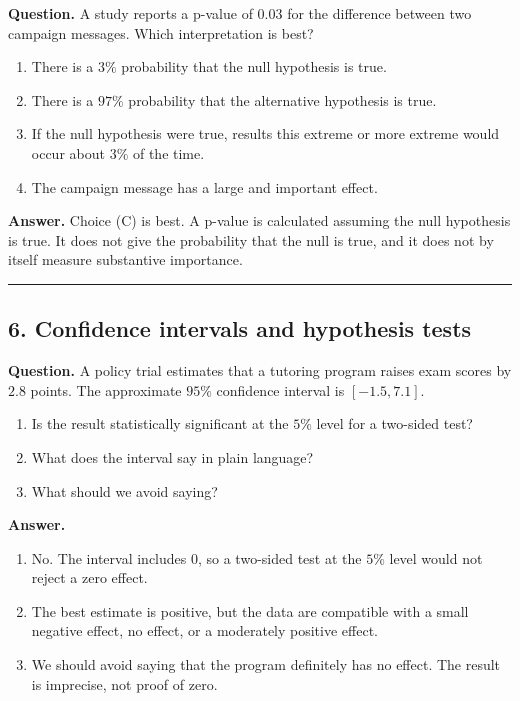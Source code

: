 \documentclass[12pt]{article}
\begin{document}
\noindent
\textbf{Question.}
A study reports a p-value of $0.03$ for the difference between two campaign messages. Which interpretation is best?

\begin{enumerate}[label=(\Alph*)]
\item There is a $3\%$ probability that the null hypothesis is true.
\item There is a $97\%$ probability that the alternative hypothesis is true.
\item If the null hypothesis were true, results this extreme or more extreme would occur about $3\%$ of the time.
\item The campaign message has a large and important effect.
\end{enumerate}

\noindent
\textbf{Answer.}
Choice (C) is best. A p-value is calculated assuming the null hypothesis is true. It does not give the probability that the null is true, and it does not by itself measure substantive importance.

\hrule

\subsection*{6. Confidence intervals and hypothesis tests}

\noindent
\textbf{Question.}
A policy trial estimates that a tutoring program raises exam scores by $2.8$ points. The approximate $95\%$ confidence interval is $[-1.5,7.1]$.

\begin{enumerate}[label=(\alph*)]
\item Is the result statistically significant at the $5\%$ level for a two-sided test?
\item What does the interval say in plain language?
\item What should we avoid saying?
\end{enumerate}

\noindent
\textbf{Answer.}
\begin{enumerate}[label=(\alph*)]
\item No. The interval includes $0$, so a two-sided test at the $5\%$ level would not reject a zero effect.
\item The best estimate is positive, but the data are compatible with a small negative effect, no effect, or a moderately positive effect.
\item We should avoid saying that the program definitely has no effect. The result is imprecise, not proof of zero.
\end{enumerate}
\end{document}
